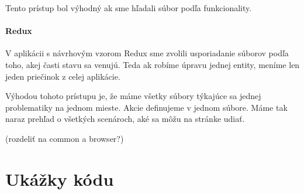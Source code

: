 Tento prístup bol výhodný ak sme hľadali súbor podľa funkcionality.

\paragraph{Redux}
V aplikácii s návrhovým vzorom Redux sme zvolili usporiadanie súborov podľa toho, akej časti stavu sa venujú. Teda ak robíme úpravu jednej entity, meníme len jeden priečinok z celej aplikácie.

Výhodou tohoto prístupu je, že máme všetky súbory týkajúce sa jednej problematiky na jednom mieste.
Akcie definujeme v jednom súbore. Máme tak naraz prehľad o všetkých scenároch, aké sa môžu na stránke udiať.

\TODO{} (rozdeliť na common a browser?)

\section{Ukážky kódu}




